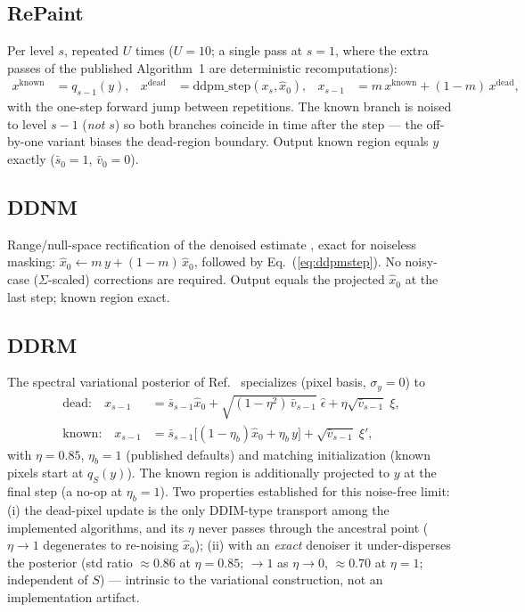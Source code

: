 \documentclass[11pt]{article}
\begin{document}
\subsection{RePaint}
Per level $s$, repeated $U$ times ($U = 10$; a single pass at $s = 1$,
where the extra passes of the published Algorithm~1 are deterministic
recomputations):
\begin{align}
  x^{\mathrm{known}} &= q_{s-1}(y), &
  x^{\mathrm{dead}} &= \mathrm{ddpm\_step}(x_s, \hat x_0), &
  x_{s-1} &= m \, x^{\mathrm{known}} + (1{-}m)\, x^{\mathrm{dead}},
\end{align}
with the one-step forward jump between repetitions.  The known branch is
noised to level $s{-}1$ (\emph{not} $s$) so both branches coincide in
time after the step --- the off-by-one variant biases the dead-region
boundary.  Output known region equals $y$ exactly
($\bar s_0 = 1$, $\bar v_0 = 0$).

\subsection{DDNM}
Range/null-space rectification of the denoised estimate
\cite{wang2022ddnm}, exact for noiseless masking:
$\hat x_0 \leftarrow m\,y + (1{-}m)\,\hat x_0$, followed by
Eq.~(\ref{eq:ddpmstep}).  No noisy-case ($\Sigma$-scaled) corrections
are required.  Output equals the projected $\hat x_0$ at the last step;
known region exact.

\subsection{DDRM}
The spectral variational posterior of Ref.~\cite{kawar2022ddrm}
specializes (pixel basis, $\sigma_y = 0$) to
\begin{align}
  \text{dead:}\quad
  x_{s-1} &= \bar s_{s-1}\hat x_0
     + \sqrt{(1-\eta^2)\,\bar v_{s-1}}\;\hat\epsilon
     + \eta\sqrt{\bar v_{s-1}}\;\xi,\\
  \text{known:}\quad
  x_{s-1} &= \bar s_{s-1}\bigl[(1-\eta_b)\hat x_0 + \eta_b\, y\bigr]
     + \sqrt{\bar v_{s-1}}\;\xi',
\end{align}
with $\eta = 0.85$, $\eta_b = 1$ (published defaults) and matching
initialization (known pixels start at $q_S(y)$).  The known region is
additionally projected to $y$ at the final step (a no-op at
$\eta_b = 1$).  Two properties established for this noise-free limit:
(i) the dead-pixel update is the only DDIM-type transport among the
implemented algorithms, and its $\eta$ never passes through the
ancestral point ($\eta \to 1$ degenerates to re-noising $\hat x_0$);
(ii) with an \emph{exact} denoiser it under-disperses the posterior
(std ratio $\approx 0.86$ at $\eta = 0.85$; $\to 1$ as $\eta \to 0$,
$\approx 0.70$ at $\eta = 1$; independent of $S$) --- intrinsic to the
variational construction, not an implementation artifact.
\end{document}

